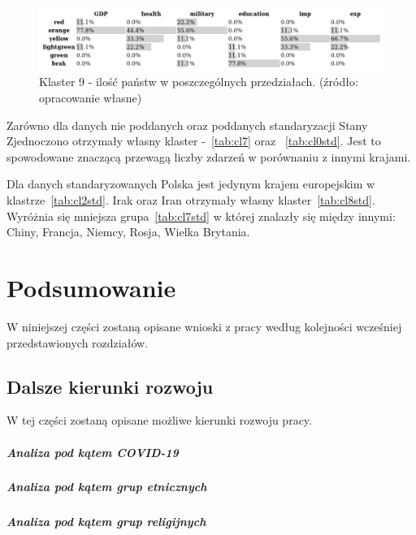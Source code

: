 \documentclass[11pt]{report}
\begin{document}
    \begin{figure}[ht!]
        \centering
        \includegraphics[width=1 \textwidth]{tables/CLUST/cluster9stdkmeanscount.png}
        \caption{Klaster 9 - ilość państw w poszczególnych przedziałach. (źródło: opracowanie własne)}
        \label{tab:cl9stdcount}
    \end{figure}

    


    Zarówno dla danych nie poddanych oraz poddanych standaryzacji Stany Zjednoczono otrzymały własny klaster -~\ref{tab:cl7} oraz ~\ref{tab:cl0std}.
    Jest to spowodowane znaczącą przewagą liczby zdarzeń w porównaniu z innymi krajami.

    Dla danych standaryzowanych Polska jest jedynym krajem europejskim w klastrze~\ref{tab:cl2std}.
    Irak oraz Iran otrzymały własny klaster~\ref{tab:cl8std}.
    Wyróżnia się mniejsza grupa~\ref{tab:cl7std} w której znalazły się między innymi: Chiny, Francja, Niemcy, Rosja, Wielka Brytania.


    \chapter{Podsumowanie}
    W niniejszej części zostaną opisane wnioski z pracy według kolejności wcześniej przedstawionych rozdziałów.


    \section{Dalsze kierunki rozwoju}
    W tej części zostaną opisane możliwe kierunki rozwoju pracy.

    \paragraph{Analiza pod kątem COVID-19}

    \paragraph{Analiza pod kątem grup etnicznych}

    \paragraph{Analiza pod kątem grup religijnych}



    \newpage
    \printbibliography[title={Bibliografia}]
\end{document}
